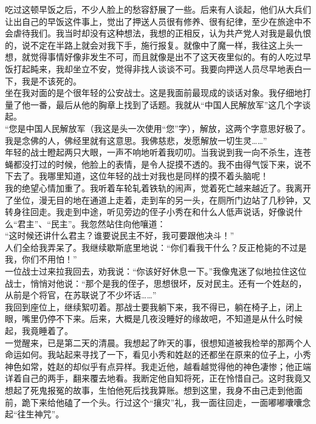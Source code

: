 吃过这顿早饭之后，不少人脸上的愁容舒展了一些。后来有人谈起，他们从大兵们让出自己的早饭这件事上，觉出了押送人员很有修养、很有纪律，至少在旅途中不会虐待我们。我当时却没有这种想法，我想的正相反，认为共产党人对我是最仇恨的，说不定在半路上就会对我下手，施行报复。就像中了魔一样，我往这上头一想，就觉得事情好像非发生不可，而且就像是出不了这天夜里似的。有的人吃过早饭打起盹来，我却坐立不安，觉得非找人谈谈不可。我要向押送人员尽早地表白一下，我是不该死的。\\

坐在我对面的是个很年轻的公安战士。这是我面前最现成的谈话对象。我仔细地打量了他一番，最后从他的胸章上找到了话题。我就从“中国人民解放军”这几个字谈起。\\

“您是中国人民解放军（我这是头一次使用“您”字），解放，这两个字意思好极了。我是念佛的人，佛经里就有这意思。我佛慈悲，发愿解放一切生灵……”\\

年轻的战士瞪起两只大眼，一声不响地听着我叨叨。当我说到我一向不杀生，连苍蝇都没打过的时候，他脸上的表情，是令人捉摸不透的。我不由得气馁下来，说不下去了。我哪里知道，这位年轻的战士对我也是同样的摸不着头脑呢！\\

我的绝望心情加重了。我听着车轮轧着铁轨的闹声，觉着死亡越来越近了。我离开了坐位，漫无目的地在通道上走着，走到车的另一头，在厕所门边站了几秒钟，又转身往回走。我走到中途，听见旁边的侄子小秀在和什么人低声说话，好像说什么“君主”、“民主”。我忽然站住向他嚷道：\\

“这时候还讲什么君主？谁要说民主不好，我可要跟他决斗！”\\

人们全给我弄呆了。我继续歇斯底里地说：“你们看我干什么？反正枪毙的不过是我，你们不用怕！”\\

一位战士过来拉我回去，劝我说：“你该好好休息一下。”我像鬼迷了似地拉住这位战士，悄悄对他说：“那个是我的侄子，思想很坏，反对民主。还有一个姓赵的，从前是个将官，在苏联说了不少坏话……”\\

我回到座位上，继续絮叨着。那战士要我躺下来，我不得已，躺在椅子上，闭上眼，嘴里仍停不下来。后来，大概是几夜没睡好的缘故吧，不知道是从什么时候起，我竟睡着了。\\

一觉醒来，已是第二天的清晨。我想起了昨天的事，很想知道被我检举的那两个人命运如何。我站起来寻找了一下，看见小秀和姓赵的还都坐在原来的位子上，小秀神色如常，姓赵的却似乎有点异样。我走近他，越看越觉得他的神色凄惨；他正端详着自己的两手，翻来覆去地看。我断定他自知将死，正在怜惜自己。这时我竟又想起了死鬼报冤的故事，生怕他死后找我算账。想到这里，我身不由己走到他面前，跪下来给他磕了一个头。行过这个“攘灾”礼，我一面往回走，一面嘟嘟囔囔念起“往生神咒”。\\

